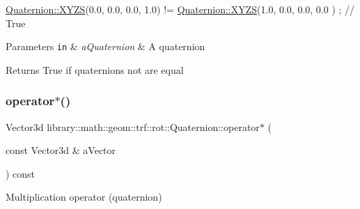 \begin{DoxyCode}
\hyperlink{classlibrary_1_1math_1_1geom_1_1trf_1_1rot_1_1_quaternion_afff9523c7dcbfbbc521736121e62ad41}{Quaternion::XYZS}(0.0, 0.0, 0.0, 1.0) != \hyperlink{classlibrary_1_1math_1_1geom_1_1trf_1_1rot_1_1_quaternion_afff9523c7dcbfbbc521736121e62ad41}{Quaternion::XYZS}(1.0, 0.0, 0.0, 0.0
      ) ; \textcolor{comment}{// True}
\end{DoxyCode}



\begin{DoxyParams}[1]{Parameters}
\mbox{\tt in}  & {\em a\+Quaternion} & A quaternion \\
\hline
\end{DoxyParams}
\begin{DoxyReturn}{Returns}
True if quaternions not are equal 
\end{DoxyReturn}
\mbox{\label{classlibrary_1_1math_1_1geom_1_1trf_1_1rot_1_1_quaternion_a6591efb9050f24e2b9d5c440dfeecc5f}} 
\subsubsection{\texorpdfstring{operator$\ast$()}{operator*()}}
{\footnotesize\ttfamily Vector3d library\+::math\+::geom\+::trf\+::rot\+::\+Quaternion\+::operator$\ast$ (\begin{DoxyParamCaption}\item[{const Vector3d \&}]{a\+Vector }\end{DoxyParamCaption}) const}



Multiplication operator (quaternion) 


